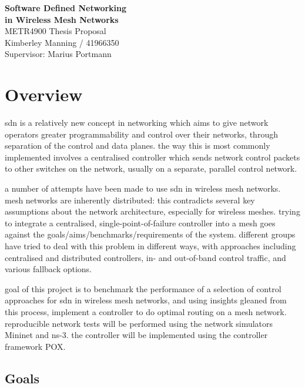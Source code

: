 \documentclass[pdftex,12pt,a4paper]{article}
\begin{document}
\thispagestyle{empty}
\begin{center}
\vspace*{35mm}
{\huge\bf
        Software Defined Networking \\
	in Wireless Mesh Networks \\
}
\vspace{20mm}
{\Large METR4900 Thesis Proposal \\}
\vspace{20mm}
        Kimberley Manning / 41966350 \\
	Supervisor: Marius Portmann
\end{center}

\newpage
\thispagestyle{empty}
\tableofcontents

\newpage
{}
\section{Overview}
    sdn is a relatively new concept in networking which aims to give network operators greater programmability and control over their networks, through separation of the control and data planes. the way this is most commonly implemented involves a centralised controller which sends network control packets to other switches on the network, usually on a separate, parallel control network. 

a number of attempts have been made to use sdn in wireless mesh networks. mesh networks are inherently distributed: this contradicts several key assumptions about the network architecture, especially for wireless meshes. trying to integrate a centralised, single-point-of-failure controller into a mesh goes against the goals/aims/benchmarks/requirements of the system. different groups have tried to deal with this problem in different ways, with approaches including centralised and distributed controllers, in- and out-of-band control traffic, and various fallback options.

goal of this project is to benchmark the performance of a selection of control approaches for sdn in wireless mesh networks, and using insights gleaned from this process, implement a controller to do optimal routing on a mesh network. reproducible network tests will be performed using the network simulators Mininet and ns-3. the controller will be implemented using the controller framework POX.

\subsection{Goals}
\end{document}
